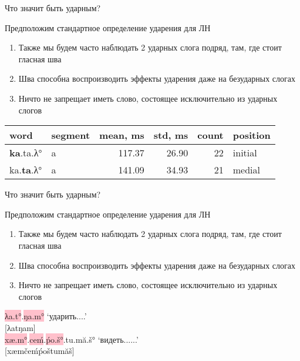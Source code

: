 \documentclass[10 pt, handout]{beamer}
\begin{document}
\begin{frame}{Что значит быть ударным?}

	Предположим стандартное определение ударения для ЛН
	\vspace*{1em}
	
	\begin{enumerate}[\ding{71}]
		\item Также мы будем часто наблюдать 2 ударных слога подряд, там, где стоит гласная шва
		\item Шва способна воспроизводить эффекты ударения даже на безударных слогах
		\item Ничто не запрещает иметь слово, состоящее исключительно из ударных слогов
	\end{enumerate}
	
	\vspace*{1em}
\begin{table}[H]
\centering
\begin{tabular}{llrrrl}
\toprule
  word & segment &  mean, ms &  std, ms &  count & position \\
\midrule
\textbf{ka}.ta.λ° &       a &    117.37 &    26.90 &     22 &  initial \\
ka.\textbf{ta}.λ° &       a &    141.09 &    34.93 &     21 &   medial \\
\bottomrule
\end{tabular}
\end{table}

\end{frame}

\begin{frame}{Что значит быть ударным?}

	Предположим стандартное определение ударения для ЛН
	\vspace*{1em}
	
	\begin{enumerate}[\ding{232}]
		\item Также мы будем часто наблюдать 2 ударных слога подряд, там, где стоит гласная шва
		\item Шва способна воспроизводить эффекты ударения даже на безударных слогах
		\item Ничто не запрещает иметь слово, состоящее исключительно из ударных слогов
	\end{enumerate}

\ex \colorbox{pink}{λa.t°}.\colorbox{pink}{ŋa.m°} \hfill `ударить.{\Gfs}.{\Obj}.{\Sg}.{\Fsg}'\\
	{[λatŋam]}\\[.5em]
	\colorbox{pink}{xæ.m°}.\colorbox{pink}{ceḿ}.\colorbox{pink}{ṕo.š°}.tu.mă.š° \hfill `видеть.{\Prog}.{\Hab}.{\Obj}.{\Sg}.{\Fsg}.{\Prt}'\\
	{[xæmčeḿṕoštumăš]}
\xe

\end{frame}
\end{document}
